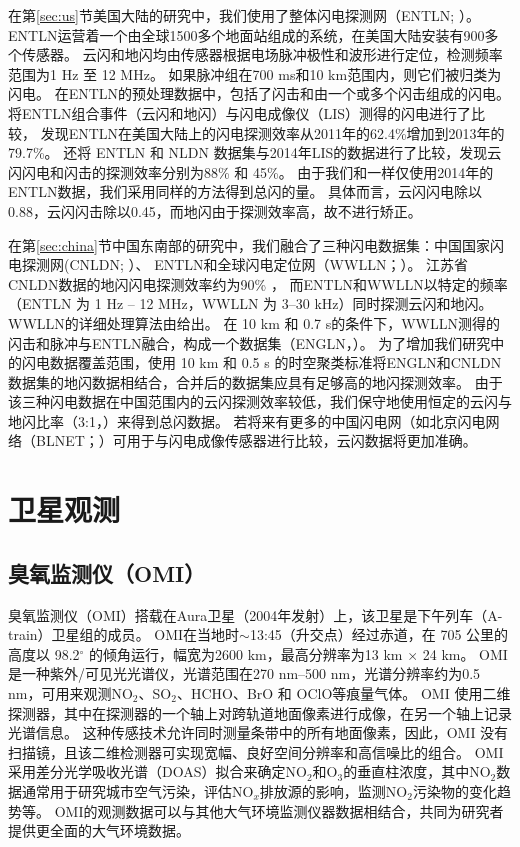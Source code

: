 在第\ref{sec:us}节美国大陆的研究中，我们使用了整体闪电探测网（ENTLN; \citet{Marchand.2019}）。
ENTLN运营着一个由全球1500多个地面站组成的系统，在美国大陆安装有900多个传感器\citep{Zhu.2017}。
云闪和地闪均由传感器根据电场脉冲极性和波形进行定位，检测频率范围为1 Hz 至 12 MHz。
如果脉冲组在700 ms和10 km范围内，则它们被归类为闪电。
在ENTLN的预处理数据中，包括了闪击和由一个或多个闪击组成的闪电。
\citet{Rudlosky.2015}将ENTLN组合事件（云闪和地闪）与闪电成像仪（LIS）测得的闪电进行了比较，
发现ENTLN在美国大陆上的闪电探测效率从2011年的62.4\%增加到2013年的79.7\%。
\citet{Lapierre.2020}还将 ENTLN 和 NLDN 数据集与2014年LIS的数据进行了比较，发现云闪闪电和闪击的探测效率分别为88\% 和 45\%。
由于我们和\citet{Lapierre.2020}一样仅使用2014年的ENTLN数据，我们采用同样的方法得到总闪的量。
具体而言，云闪闪电除以0.88，云闪闪击除以0.45，而地闪由于探测效率高，故不进行矫正。

在第\ref{sec:china}节中国东南部的研究中，我们融合了三种闪电数据集：中国国家闪电探测网(CNLDN; \citet{Yang.2015}）、
ENTLN和全球闪电定位网（WWLLN；\citet{Rodger.2006}）。
江苏省CNLDN数据的地闪闪电探测效率约为90\% \citep{Li.2017a}，
而ENTLN和WWLLN以特定的频率（ENTLN 为 1 Hz -- 12 MHz，WWLLN 为 3--30 kHz）同时探测云闪和地闪。
WWLLN的详细处理算法由\citet{Rodger.2004}给出。
在 10 km 和 0.7 s的条件下，WWLLN测得的闪击和脉冲与ENTLN融合，构成一个数据集（ENGLN，\citet{Virts.2020b}）。
为了增加我们研究中的闪电数据覆盖范围，使用 10 km 和 0.5 s 的时空聚类标准将ENGLN和CNLDN数据集的地闪数据相结合\citep{Zhao.2020}，合并后的数据集应具有足够高的地闪探测效率。
由于该三种闪电数据在中国范围内的云闪探测效率较低，我们保守地使用恒定的云闪与地闪比率（3:1，\citet{Wu.2016,Bandholnopparat.2020}）来得到总闪数据。
若将来有更多的中国闪电网（如北京闪电网络（BLNET；\citet{Srivastava.2017}）可用于与闪电成像传感器进行比较\citep{Rudlosky.2013,Poelman.2020}，云闪数据将更加准确。

\section{卫星观测}

\subsection{臭氧监测仪（OMI）}

臭氧监测仪（OMI）搭载在Aura卫星（2004年发射）上，该卫星是下午列车（A-train）卫星组的成员\citep{Levelt.2006,Levelt.2018}。
OMI在当地时$\sim$13:45（升交点）经过赤道，在 705 公里的高度以 98.2$^{\circ}$ 的倾角运行，幅宽为2600 km，最高分辨率为13 km $\times$ 24 km。
OMI是一种紫外/可见光光谱仪，光谱范围在270 nm--500 nm，光谱分辨率约为0.5 nm，可用来观测NO$_2$、SO$_2$、HCHO、BrO 和 OClO等痕量气体。
OMI 使用二维探测器，其中在探测器的一个轴上对跨轨道地面像素进行成像，在另一个轴上记录光谱信息。 这种传感技术允许同时测量条带中的所有地面像素，因此，OMI 没有扫描镜，且该二维检测器可实现宽幅、良好空间分辨率和高信噪比的组合。
OMI采用差分光学吸收光谱（DOAS）拟合来确定NO$_2$和O$_3$的垂直柱浓度，其中NO$_2$数据通常用于研究城市空气污染，评估NO$_x$排放源的影响，监测NO$_2$污染物的变化趋势等。
OMI的观测数据可以与其他大气环境监测仪器数据相结合，共同为研究者提供更全面的大气环境数据。

